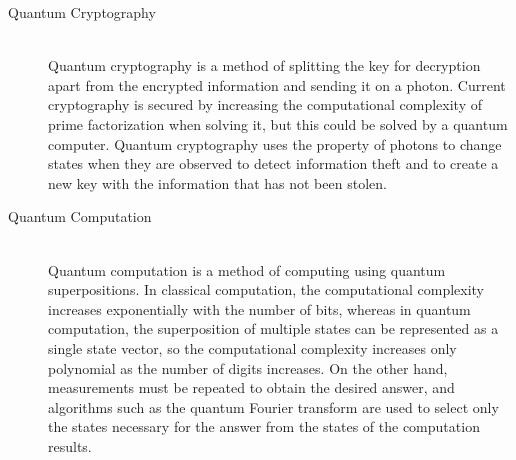 \documentclass{jarticle}
\begin{document}
\begin{itemize}
\begin{description}
            \item[Quantum Cryptography]\mbox{}\\
                Quantum cryptography is a method of splitting the key for decryption apart from the encrypted information and sending it on a photon.
                Current cryptography is secured by increasing the computational complexity of prime factorization when solving it, but this could be solved by a quantum computer.
                Quantum cryptography uses the property of photons to change states when they are observed to detect information theft and to create a new key with the information that has not been stolen.

            \item[Quantum Computation]\mbox{}\\
                Quantum computation is a method of computing using quantum superpositions.
                In classical computation, the computational complexity increases exponentially with the number of bits, whereas in quantum computation,
                the superposition of multiple states can be represented as a single state vector, so the computational complexity increases only polynomial as the number of digits increases.
                On the other hand, measurements must be repeated to obtain the desired answer, and algorithms such as the quantum Fourier transform are used to select only the states necessary for the answer from the states of the computation results.


        \end{description}
    
\end{itemize}
\end{document}
